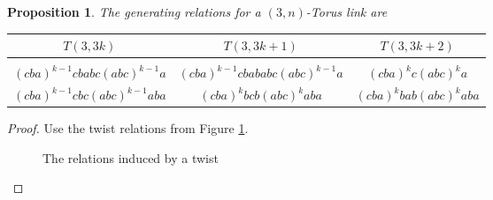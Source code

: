 \documentclass{article}
\newtheorem{proposition}[theorem]{Proposition}
\theoremstyle{definition}
\begin{document}
\begin{proposition}
The generating relations for a $(3,n)$-Torus link are
\begin{table}[ht]
\centering
\begin{tabular}{c|c|c}
{$T(3,3k)$} & {$T(3,3k+1)$} & {$T(3,3k+2)$} \\
\hline
& \\[-0.8em]
$(cba)^{k-1}cbabc(abc)^{k-1}a$ & $(cba)^{k-1}cbababc(abc)^{k-1}a$ & $(cba)^kc(abc)^ka$ \\
$(cba)^{k-1}cbc(abc)^{k-1}aba$ &  $(cba)^{k}bcb(abc)^{k}aba$ & $(cba)^kbab(abc)^kaba$\\
\end{tabular}
\end{table}
\end{proposition}

\begin{proof}
Use the twist relations from Figure \ref{fig:twistrelation}.
\begin{figure}[ht]
\caption{\label{fig:twistrelation} The relations induced by a twist}
\end{figure}
\end{proof}
\end{document}
